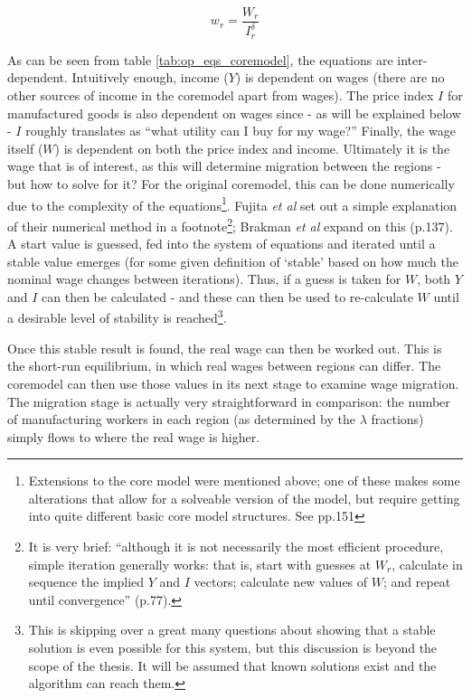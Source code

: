 \begin{equation}
w_{r}=\frac{W_{r}}{I_{r}^\delta} \label{eq:realwage}
\end{equation}

As can be seen from table \ref{tab:op_eqs_coremodel}, the equations are inter-dependent. Intuitively enough, income ($Y$) is dependent on wages (there are no other sources of income in the \gls{coremodel} apart from wages). The price index $I$ for manufactured goods is also dependent on wages since - as will be explained below - $I$ roughly translates as ``what utility can I buy for my wage?'' Finally, the wage itself ($W$) is dependent on both the price index and income. Ultimately it is the wage that is of interest, as this will determine migration between the regions - but how to solve for it? For the original \gls{coremodel}, this can be done numerically due to the complexity of the equations\footnote{Extensions to the core model were mentioned above; one of these makes some alterations that allow for a solveable version of the model, but require getting into quite different basic core model structures. See \citealt{brakman_new_2009} pp.151}. Fujita \emph{et al} set out a simple explanation of their numerical method in a footnote\footnote{It is very brief: ``although it is not necessarily the most efficient procedure, simple iteration generally works: that is, start with guesses at $W_{r}$, calculate in sequence the implied $Y$ and $I$ vectors; calculate new values of $W$; and repeat until convergence'' (p.77).}; Brakman \emph{et al} expand on this (p.137). A start value is guessed, fed into the system of equations and iterated until a stable value emerges (for some given definition of `stable' based on how much the nominal wage changes between iterations). Thus, if a guess is taken for $W$, both $Y$ and $I$ can then be calculated - and these can then be used to re-calculate $W$ until a desirable level of stability is reached\footnote{This is skipping over a great many questions about showing that a stable solution is even possible for this system, but this discussion is beyond the scope of the thesis. It will be assumed that known solutions exist and the algorithm can reach them.}.

Once this stable result is found, the real wage can then be worked out. This is the short-run equilibrium, in which real wages between regions can differ. The \gls{coremodel} can then use those values in its next stage to examine wage migration. The migration stage is actually very straightforward in comparison: the number of manufacturing workers in each region (as determined by the $\lambda$ fractions) simply flows to where the real wage is higher. 

